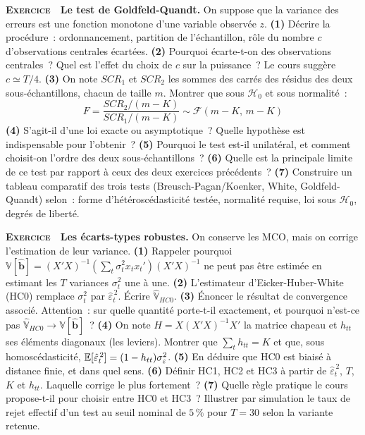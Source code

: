 \documentclass[10pt,a4paper,notitlepage]{article}
\newcounter{xnumber}
\newcommand{\exercice}{\refstepcounter{xnumber}\textsc{\textbf{Exercice}} \textbf{\thexnumber}\,\,}
\newcommand{\question}[1]{\textbf{(#1)}}
\begin{document}
\bigskip

\exercice\label{ex:goldfeld-quandt} \textbf{Le test de Goldfeld-Quandt.} On suppose que la variance des
erreurs est une fonction monotone d'une variable observée $z$. \question{1}
Décrire la procédure~: ordonnancement, partition de l'échantillon, rôle du
nombre $c$ d'observations centrales écartées. \question{2} Pourquoi écarte-t-on
des observations centrales~? Quel est l'effet du choix de $c$ sur la puissance~?
Le cours suggère $c\simeq T/4$. \question{3} On note $SCR_1$ et $SCR_2$ les
sommes des carrés des résidus des deux sous-échantillons, chacun de taille $m$.
Montrer que sous $\mathcal H_0$ et sous normalité~:
\[
  F = \frac{SCR_2/(m-K)}{SCR_1/(m-K)} \sim \mathcal F(m-K,\,m-K)
\]
\question{4} S'agit-il d'une loi exacte ou asymptotique~? Quelle hypothèse est
indispensable pour l'obtenir~? \question{5} Pourquoi le test est-il
unilatéral, et comment choisit-on l'ordre des deux sous-échantillons~?
\question{6} Quelle est la principale limite de ce test par rapport à ceux des
deux exercices précédents~? \question{7} Construire un tableau comparatif des
trois tests (Breusch-Pagan/Koenker, White, Goldfeld-Quandt) selon~: forme
d'hétéroscédasticité testée, normalité requise, loi sous $\mathcal H_0$, degrés
de liberté.\newline

\bigskip

\exercice\label{ex:hc} \textbf{Les écarts-types robustes.} On conserve les MCO, mais on
corrige l'estimation de leur variance. \question{1} Rappeler pourquoi
$\mathbb V[\hat{\mathbf b}] = (X'X)^{-1}\left(\sum_t\sigma_t^2 x_tx_t'\right)(X'X)^{-1}$
ne peut pas être estimée en estimant les $T$ variances $\sigma_t^2$ une à une.
\question{2} L'estimateur d'Eicker-Huber-White (HC0) remplace $\sigma_t^2$ par
$\hat\varepsilon_t^{\,2}$. Écrire $\widehat{\mathbb V}_{HC0}$. \question{3}
Énoncer le résultat de convergence associé. Attention~: sur quelle quantité
porte-t-il exactement, et pourquoi n'est-ce pas
$\widehat{\mathbb V}_{HC0}\to\mathbb V[\hat{\mathbf b}]$~? \question{4} On note
$H = X(X'X)^{-1}X'$ la matrice chapeau et $h_{tt}$ ses éléments diagonaux
(les leviers). Montrer que $\sum_t h_{tt} = K$ et que, sous homoscédasticité,
$\mathbb E[\hat\varepsilon_t^{\,2}] = (1-h_{tt})\sigma_{\varepsilon}^2$. \question{5} En
déduire que HC0 est biaisé à distance finie, et dans quel sens. \question{6}
Définir HC1, HC2 et HC3 à partir de $\hat\varepsilon_t^{\,2}$, $T$, $K$ et
$h_{tt}$. Laquelle corrige le plus fortement~? \question{7} Quelle règle
pratique le cours propose-t-il pour choisir entre HC0 et HC3~? Illustrer par
simulation le taux de rejet effectif d'un test au seuil nominal de $5\,\%$ pour
$T=30$ selon la variante retenue.\newline
\end{document}
